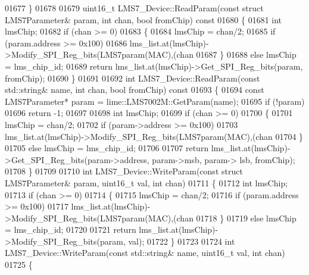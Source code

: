 \begin{DoxyCode}
{{{01677 \}
01678 
01679 uint16\_t LMS7_Device::ReadParam(\textcolor{keyword}{const} \textcolor{keyword}{struct} LMS7Parameter& param, \textcolor{keywordtype}{int} chan, \textcolor{keywordtype}{bool} fromChip)\textcolor{keyword}{ const}
01680 \textcolor{keyword}{}\{
01681     \textcolor{keywordtype}{int} lmsChip;
01682     \textcolor{keywordflow}{if} (chan >= 0)
01683     \{
01684         lmsChip = chan/2;
01685         \textcolor{keywordflow}{if} (param.address >= 0x100)
01686             lms_list.at(lmsChip)->Modify\_SPI\_Reg\_bits(LMS7param(MAC),(chan%
01687     \}
01688     \textcolor{keywordflow}{else} lmsChip = lms_chip_id;
01689     \textcolor{keywordflow}{return} lms_list.at(lmsChip)->Get\_SPI\_Reg\_bits(param, fromChip);
01690 \}
01691 
01692 \textcolor{keywordtype}{int} LMS7_Device::ReadParam(\textcolor{keyword}{const} std::string& name, \textcolor{keywordtype}{int} chan, \textcolor{keywordtype}{bool} fromChip)\textcolor{keyword}{ const}
01693 \textcolor{keyword}{}\{
01694     \textcolor{keyword}{const} LMS7Parameter* param = lime::LMS7002M::GetParam(name);
01695     \textcolor{keywordflow}{if} (!param)
01696         \textcolor{keywordflow}{return} -1;
01697 
01698     \textcolor{keywordtype}{int} lmsChip;
01699     \textcolor{keywordflow}{if} (chan >= 0)
01700     \{
01701         lmsChip = chan/2;
01702         \textcolor{keywordflow}{if} (param->address >= 0x100)
01703             lms_list.at(lmsChip)->Modify\_SPI\_Reg\_bits(LMS7param(MAC),(chan%
01704     \}
01705     \textcolor{keywordflow}{else} lmsChip = lms_chip_id;
01706 
01707     \textcolor{keywordflow}{return} lms_list.at(lmsChip)->Get\_SPI\_Reg\_bits(param->address, param->msb, param->
      lsb, fromChip);
01708 \}
01709 
01710 \textcolor{keywordtype}{int} LMS7_Device::WriteParam(\textcolor{keyword}{const} \textcolor{keyword}{struct} LMS7Parameter& param, uint16\_t val, \textcolor{keywordtype}{int} 
      chan)
01711 \{
01712     \textcolor{keywordtype}{int} lmsChip;
01713     \textcolor{keywordflow}{if} (chan >= 0)
01714     \{
01715         lmsChip = chan/2;
01716         \textcolor{keywordflow}{if} (param.address >= 0x100)
01717             lms_list.at(lmsChip)->Modify\_SPI\_Reg\_bits(LMS7param(MAC),(chan%
01718     \}
01719     \textcolor{keywordflow}{else} lmsChip = lms_chip_id;
01720 
01721     \textcolor{keywordflow}{return} lms_list.at(lmsChip)->Modify\_SPI\_Reg\_bits(param, val);
01722 \}
01723 
01724 \textcolor{keywordtype}{int} LMS7_Device::WriteParam(\textcolor{keyword}{const} std::string& name, uint16\_t val, \textcolor{keywordtype}{int} chan)
01725 \{
}}}
\end{DoxyCode}
